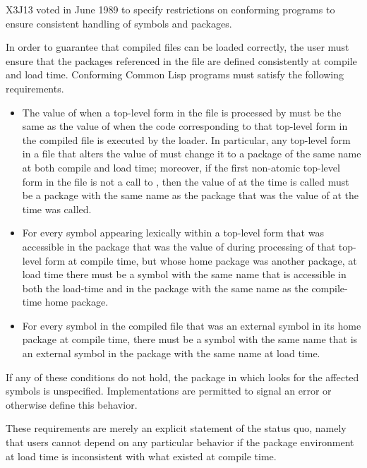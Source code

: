\begin{newer}
X3J13 voted in June 1989  to specify
restrictions on conforming programs to ensure consistent handling of symbols
and packages.

  In order to guarantee that compiled files can be loaded correctly,
  the user must ensure that the packages referenced in the file are defined
  consistently at compile and load time.  Conforming Common Lisp programs
  must satisfy the following requirements.
\begin{itemize}
\item The value of  when a top-level form in the file is processed
      by  must be the same as the value of  when the
      code corresponding to that top-level form in the compiled file is
      executed by the loader.  In particular,
      any top-level form in a file that alters the value of 
          must change it to a package of the same name at both compile and
          load time; moreover, if the first non-atomic top-level form
          in the file is not a call to
          , then the value of  at the time  is
          called must be a package with the same name as the package that
          was the value of  at the time  was called.

\item For every symbol appearing lexically within a top-level form that
      was accessible in the package that was the value of 
      during processing of that top-level form at compile time, but
      whose home package was another package, at load time there must
      be a symbol with the same name that is accessible in both the
      load-time  and in the package with the same name as the
      compile-time home package. 
  
\item For every symbol in the compiled file that was an external symbol in
      its home package at compile time, there must be a symbol with the
      same name that is an external symbol in the package with the same name
      at load time.
\end{itemize}
  If any of these conditions do not hold, the package in which  looks
  for the affected symbols is unspecified.  Implementations are permitted 
  to signal an error or otherwise define this behavior.

    These requirements are merely an explicit statement of the status quo,
    namely that users cannot depend on any particular behavior if the
    package environment at load time is inconsistent with what existed
    at compile time. 
\end{newer}


